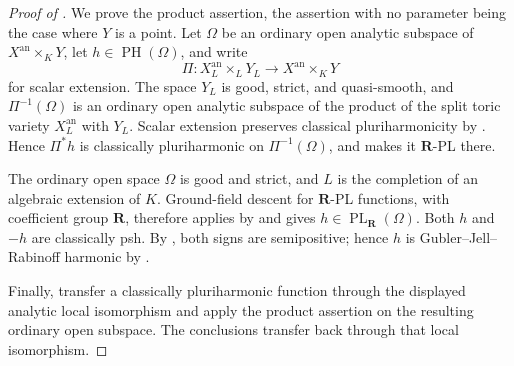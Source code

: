 
\begin{proof}[Proof of
]
We prove the product assertion, the assertion with no parameter being the
case where \(Y\) is a point.  Let \(\Omega\) be an ordinary open analytic
subspace of \(X^{\mathrm{an}}\times_KY\), let \(h\in\operatorname{PH}(\Omega)\),
and write
\[
 \Pi:X_L^{\mathrm{an}}\times_LY_L
       \longrightarrow X^{\mathrm{an}}\times_KY
\]
for scalar extension.  The space \(Y_L\) is good, strict, and quasi-smooth,
and \(\Pi^{-1}(\Omega)\) is an ordinary open analytic subspace of the
product of the split toric variety \(X_L^{\mathrm{an}}\) with \(Y_L\).
Scalar extension preserves classical pluriharmonicity by
\cite[Proposition~7.2(6)]{GR25Classical}.  Hence
\(\Pi^*h\) is classically pluriharmonic on \(\Pi^{-1}(\Omega)\), and
 makes it
\(\mathbf R\)-PL there.

The ordinary open space \(\Omega\) is good and strict, and \(L\) is the
completion of an algebraic extension of \(K\).  Ground-field descent for
\(\mathbf R\)-PL functions, with coefficient group \(\mathbf R\), therefore
applies by \cite[Corollary~5.12]{GJR26} and gives
\(h\in\operatorname{PL}_{\mathbf R}(\Omega)\).  Both \(h\) and \(-h\) are
classically psh.  By \cite[Theorem~4.3]{GR25Classical}, both signs are
semipositive; hence \(h\) is Gubler--Jell--Rabinoff harmonic by
\cite[Definition~7.2]{GJR26}.

Finally, transfer a classically pluriharmonic function through the displayed
analytic local isomorphism and apply the product assertion on the resulting
ordinary open subspace.  The conclusions transfer back through that local
isomorphism.
\end{proof}
